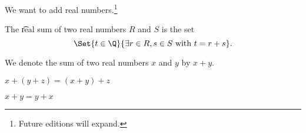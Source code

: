 

We want to add real numbers.\footnote{Future editions will expand.}


The \t{real sum} of two real numbers $R$ and $S$ is the set
\[
  \Set{t \in \Q}{\exists r \in R, s \in S \text{ with } t = r + s}.
\]


We denote the sum of two real numbers $x$ and $y$ by $x + y$.


\begin{proposition}[Associative]
  $x + (y + z) = (x + y) + z$
\end{proposition}

\begin{proposition}[Commutative]
  $x + y = y + x$
\end{proposition}

\blankpage

